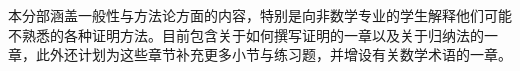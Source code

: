 \documentclass[../../include/open-logic-part]{subfiles}
\begin{document}

\begin{editorial}
  本分部涵盖一般性与方法论方面的内容，特别是向非数学专业的学生解释他们可能不熟悉的各种证明方法。目前包含关于如何撰写证明的一章以及关于归纳法的一章，此外还计划为这些章节补充更多小节与练习题，并增设有关数学术语的一章。
\end{editorial}



\OLEndPartHook
\end{document}
